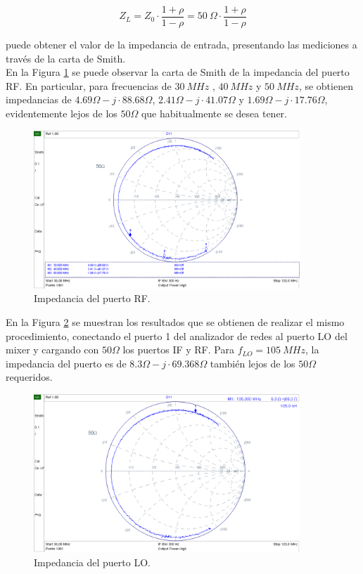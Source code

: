 \documentclass[a4paper,10pt]{article}
\begin{document}
	$$Z_L =Z_0\cdot\frac{1+\rho}{1-\rho}=50~\Omega\cdot\frac{1+\rho}{1-\rho}$$
	
	puede obtener el valor de la impedancia de entrada, presentando las 
	mediciones a trav\'es de la carta de Smith. \\
	\indent En la Figura \ref{impedancia1} se puede observar la carta de Smith 
	de la impedancia del puerto RF. En particular, para  frecuencias de $30~MHz$
	, $40~MHz$ y $50~MHz$, se obtienen impedancias de 
	$4.69\Omega-j\cdot88.68\Omega$, $2.41\Omega-j\cdot41.07\Omega$ y 
	$1.69\Omega-j\cdot17.76\Omega$, evidentemente lejos de los $50\Omega$ que 
	habitualmente se desea tener.	
	
	\begin{figure}[!htb]
		\centering
		\includegraphics[width=10cm]{Images/impedanciaRF.png}
		\caption{Impedancia del puerto RF.}
		\label{impedancia1}
	\end{figure}
	
	\indent En la Figura \ref{impedancia2} se muestran los resultados que se obtienen de
	realizar el mismo procedimiento, conectando el puerto 1 del analizador de 
	redes al puerto LO del mixer y cargando con $50\Omega$ los puertos IF y RF. 
	Para $f_{LO}=105~MHz$, la impedancia del puerto es de 
	$8.3\Omega-j\cdot69.368\Omega$ tambi\'en lejos de los $50\Omega$ requeridos.
	
	\begin{figure}[!htb]
		\centering
		\includegraphics[width=10cm]{Images/impedanciaLO.png}
		\caption{Impedancia del puerto LO.}
		\label{impedancia2}		
	\end{figure}
	
\end{document}
